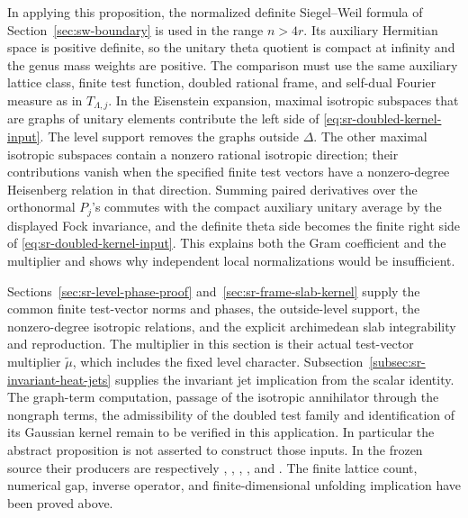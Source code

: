 In applying this proposition, the normalized definite
Siegel--Weil formula of
Section~\ref{sec:sw-boundary} is used in the range \(n>4r\).
Its auxiliary Hermitian space is positive definite, so the
unitary theta quotient is compact at infinity and the genus mass
weights are positive.
The comparison must use the same auxiliary lattice class,
finite test function, doubled rational frame, and self-dual
Fourier measure as in \(T_{\Lambda,j}\).
In the Eisenstein expansion, maximal isotropic subspaces that
are graphs of unitary elements contribute the left side of
\eqref{eq:sr-doubled-kernel-input}.
The level support removes the graphs outside \(\Delta\).
The other maximal isotropic subspaces contain a nonzero rational
isotropic direction; their contributions vanish when the specified
finite test vectors have a nonzero-degree Heisenberg relation in
that direction.
Summing paired derivatives over the orthonormal \(P_j\)'s commutes
with the compact auxiliary unitary average by the displayed
Fock invariance, and the definite theta side becomes the finite
right side of \eqref{eq:sr-doubled-kernel-input}.
This explains both the Gram coefficient and the multiplier and
shows why independent local normalizations would be insufficient.

Sections~\ref{sec:sr-level-phase-proof} and~\ref{sec:sr-frame-slab-kernel}
supply the common finite test-vector norms and phases, the outside-level
support, the nonzero-degree isotropic relations, and the explicit
archimedean slab integrability and reproduction.
The multiplier in this section is their actual test-vector multiplier
\(\widetilde\mu\), which includes the fixed level character.
Subsection~\ref{subsec:sr-invariant-heat-jets} supplies the invariant
jet implication from the scalar identity.
The graph-term computation, passage of the isotropic annihilator
through the nongraph terms, the admissibility of the doubled test
family and identification of its Gaussian kernel remain to be
verified in this application.  In particular
the abstract proposition is not asserted to construct those inputs.
In the frozen source their producers are respectively
,
,
,
, and
.
The finite lattice count, numerical gap, inverse operator, and
finite-dimensional unfolding implication have been proved above.
